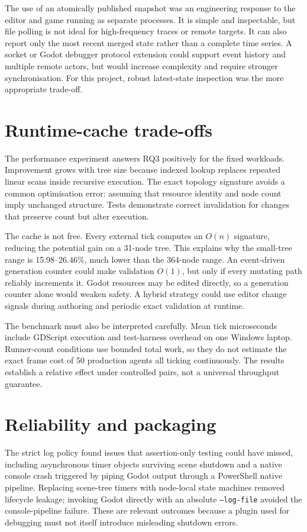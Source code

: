 The use of an atomically published snapshot was an engineering response to the editor and game running as separate processes. It is simple and inspectable, but file polling is not ideal for high-frequency traces or remote targets. It can also report only the most recent merged state rather than a complete time series. A socket or Godot debugger protocol extension could support event history and multiple remote actors, but would increase complexity and require stronger synchronisation. For this project, robust latest-state inspection was the more appropriate trade-off.

\section{Runtime-cache trade-offs}

The performance experiment answers RQ3 positively for the fixed workloads. Improvement grows with tree size because indexed lookup replaces repeated linear scans inside recursive execution. The exact topology signature avoids a common optimisation error: assuming that resource identity and node count imply unchanged structure. Tests demonstrate correct invalidation for changes that preserve count but alter execution.

The cache is not free. Every external tick computes an \(O(n)\) signature, reducing the potential gain on a 31-node tree. This explains why the small-tree range is 15.98--26.46\%, much lower than the 364-node range. An event-driven generation counter could make validation \(O(1)\), but only if every mutating path reliably increments it. Godot resources may be edited directly, so a generation counter alone would weaken safety. A hybrid strategy could use editor change signals during authoring and periodic exact validation at runtime.

The benchmark must also be interpreted carefully. Mean tick microseconds include GDScript execution and test-harness overhead on one Windows laptop. Runner-count conditions use bounded total work, so they do not estimate the exact frame cost of 50 production agents all ticking continuously. The results establish a relative effect under controlled pairs, not a universal throughput guarantee.

\section{Reliability and packaging}

The strict log policy found issues that assertion-only testing could have missed, including asynchronous timer objects surviving scene shutdown and a native console crash triggered by piping Godot output through a PowerShell native pipeline. Replacing scene-tree timers with node-local state machines removed lifecycle leakage; invoking Godot directly with an absolute \texttt{--log-file} avoided the console-pipeline failure. These are relevant outcomes because a plugin used for debugging must not itself introduce misleading shutdown errors.

